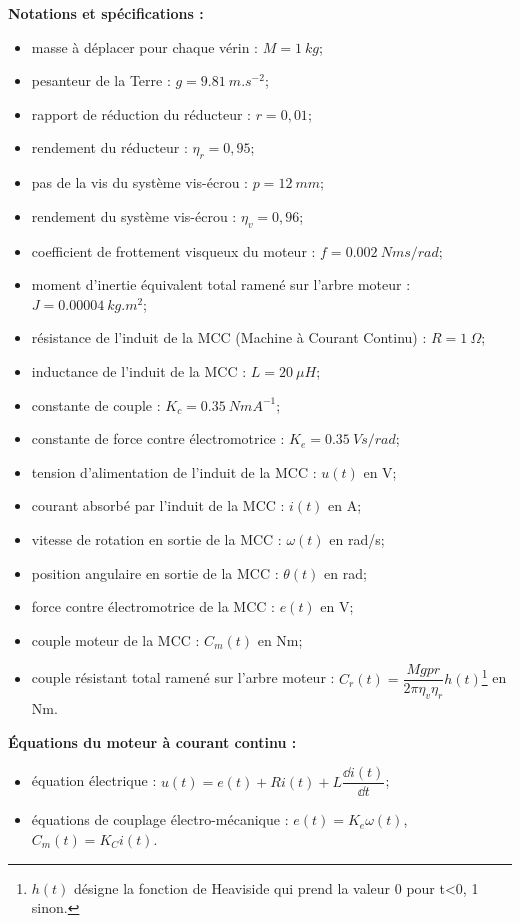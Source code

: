 \textbf{Notations et spécifications :}
\begin{multicols}{2}
\begin{itemize}
\item masse à déplacer pour chaque vérin : $M =\SI{1}{kg}$;
\item pesanteur de la Terre : $g = \SI{9,81}{m.s^{-2}}$;
\item rapport de réduction du réducteur : $r = 0,01$;
\item rendement du réducteur : $\eta_r = 0,95$;
\item pas de la vis du système vis-écrou : $p = \SI{12}{mm}$;
\item rendement du système vis-écrou : $\eta_v = 0,96$;
\item coefficient de frottement visqueux du moteur : $f=\SI{0,002}{Nms/rad}$;
\item moment d’inertie équivalent total ramené sur l’arbre moteur : $J = \SI{0,00004}{kg.m^2}$;
\item résistance de l’induit de la MCC (Machine à Courant Continu) : $R =\SI{1}{\Omega}$;
\item inductance de l’induit de la MCC : $L = \SI{20}{\mu H}$;
\item constante de couple : $K_c = \SI{0,35}{NmA^{-1}}$;
\item constante de force contre électromotrice : $K_e = \SI{0,35}{Vs/rad}$;
\item tension d’alimentation de l’induit de la MCC : $u(t)$ en \si{V};
\item courant absorbé par l’induit de la MCC : $i(t)$ en \si{A};
\item vitesse de rotation en sortie de la MCC : $\omega(t)$ en \si{rad/s};
\item position angulaire en sortie de la MCC :  $\theta(t)$ en \si{rad};
\item force contre électromotrice de la MCC : $e(t)$ en \si{V};
\item couple moteur de la MCC : $C_m(t)$ en \si{Nm};
\item couple résistant total ramené sur l’arbre moteur : $C_r(t) = \dfrac{Mgpr}{2\pi \eta_v \eta_r} h(t)$\footnote{$h(t)$ désigne la fonction de Heaviside qui prend la valeur 0 pour t<0, 1 sinon.} en \si{Nm}.
\end{itemize}
\end{multicols}

\textbf{Équations du moteur à courant continu :}
\begin{multicols}{2}
\begin{itemize}
\item équation électrique : $u(t)=e(t)+Ri(t)+L\dfrac{\dd i(t)}{\dd t}$;
\item équations de couplage électro-mécanique : $e(t)=K_e \omega(t)$, $C_m(t)=K_C i(t)$.
\end{itemize}
\end{multicols}
\fi



